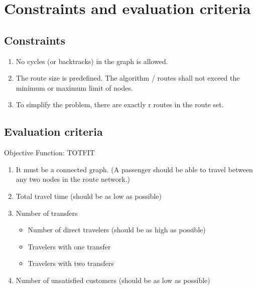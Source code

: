 \section{Constraints and evaluation criteria}

\subsection{Constraints}
\begin{enumerate}
\item \label{itm:constraintCycles} No cycles (or backtracks) in the graph is allowed.
\item \label{itm:constraintRouteSize} The route size is predefined. The algorithm / routes shall not exceed the minimum or maximum limit of nodes.
\item \label{itm:constraintRouteSet} To simplify the problem, there are exactly r routes in the route set.
\end{enumerate}

\subsection{Evaluation criteria}
Objective Function: TOTFIT
\begin{enumerate}
\item \label{itm:criteriaConnectedGraph} It must be a connected graph. (A passenger should be able to travel between any two nodes in the route network.) 
\item \label{itm:criteriaTotalTravelTime} Total travel time (should be as low as possible)
\item \label{itm:f2} Number of transfers
\begin{itemize}
\item Number of direct travelers (should be as high as possible)
\item Travelers with one transfer
\item Travelers with two transfers
\end{itemize}
\item \label{itm:TODO} Number of unsatisfied customers (should be as low as possible)
\end{enumerate}

